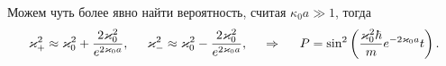 Можем чуть более явно найти вероятность, считая $\kappa_0 a \gg 1$, тогда
\begin{equation*}
    \kappa_+^2 \approx \kappa_0^2 + \frac{2 \kappa_0^2}{e^{2 \kappa_0 a}}, 
    \hspace{5 mm} 
    \kappa_-^2 \approx \kappa_0^2 - \frac{2 \kappa_0^2}{e^{2 \kappa_0 a}}, 
    \hspace{0.5cm} \Rightarrow \hspace{0.5cm}
    P = \sin^2 \left(
        \frac{\kappa_0^2 \hbar}{m} e^{- 2 \kappa_0 a} t
    \right).
\end{equation*}
